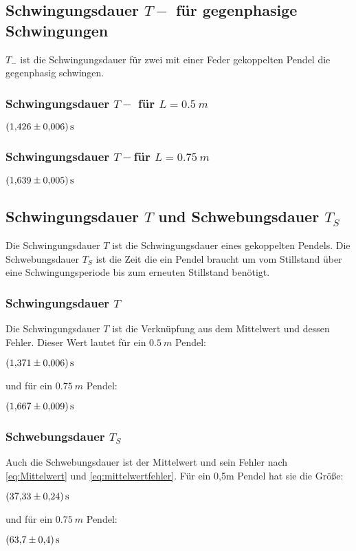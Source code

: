 \subsection{Schwingungsdauer $T-$ für gegenphasige Schwingungen}
$T_-$ ist die Schwingungsdauer für zwei mit einer Feder gekoppelten Pendel die gegenphasig schwingen.
\subsubsection{Schwingungsdauer $T-$ für $L=\SI{0,5}{m}$}
\label{sec:T-50}
\begin{center}
  $\SI{1.426\pm0.006}{s}$
\end{center}
\subsubsection{Schwingungsdauer $T-$für $L=\SI{0,75}{m}$}
\label{sec:T-75}
\begin{center}
  $\SI{1.639\pm0.005}{s}$
\end{center}


\subsection{Schwingungsdauer $T$ und Schwebungsdauer $T_S$}
Die Schwingungsdauer $T$ ist die Schwingungsdauer eines gekoppelten Pendels. Die Schwebungsdauer $T_S$ ist 
die Zeit die ein Pendel braucht um vom Stillstand über eine Schwingungsperiode bis zum erneuten Stillstand 
benötigt.
\subsubsection{Schwingungsdauer $T$}
Die Schwingungsdauer $T$ ist die Verknüpfung aus dem Mittelwert und dessen Fehler.
Dieser Wert lautet für ein $\SI{0,5}{m}$ Pendel:
\begin{center}
  $\SI{1.371\pm0.006}{s}$
\end{center}
und für ein $\SI{0,75}{m}$ Pendel:
\begin{center}
  $\SI{1.667\pm0.009}{s}$
\end{center}
\subsubsection{Schwebungsdauer $T_S$}
Auch die Schwebungsdauer ist der Mittelwert und sein Fehler nach \autoref{eq:Mittelwert} und \autoref{eq:mittelwertfehler}.
Für ein 0,5m Pendel hat sie die Größe:
\begin{center}
  $\SI{37.33\pm0.24}{s}$
\end{center}
und für ein $\SI{0,75}{m}$ Pendel:
\begin{center}
  $\SI{63,7\pm0,4}{s}$
\end{center}


